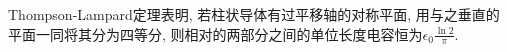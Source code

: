 \documentclass[hidelinks]{ctexart}
\begin{document}
Thompson-Lampard定理表明, 若柱状导体有过平移轴的对称平面, 用与之垂直的平面一同将其分为四等分, 则相对的两部分之间的单位长度电容恒为$\displaystyle \epsilon_0 \frac{\ln 2}{\pi}$.
\end{document}
